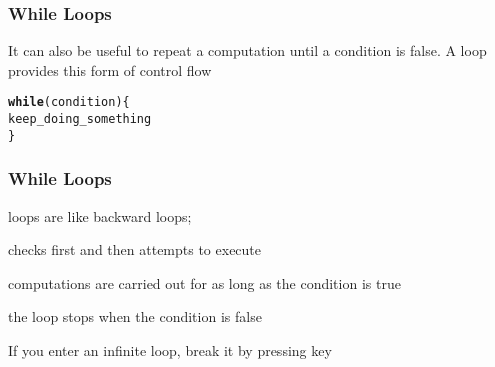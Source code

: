 \documentclass[12pt]{beamer}\usepackage[]{graphicx}\usepackage[]{color}
\makeatletter
\newcommand{\hlstd}[1]{\textcolor[rgb]{0.345,0.345,0.345}{#1}}%
\newcommand{\hlkwa}[1]{\textcolor[rgb]{0.161,0.373,0.58}{\textbf{#1}}}%
\newenvironment{kframe}{%
 \def\at@end@of@kframe{}%
 \ifinner\ifhmode%
  \def\at@end@of@kframe{\end{minipage}}%
  \begin{minipage}{\columnwidth}%
 \fi\fi%
 \def\FrameCommand##1{\hskip\@totalleftmargin \hskip-\fboxsep
 \colorbox{shadecolor}{##1}\hskip-\fboxsep
     \hskip-\linewidth \hskip-\@totalleftmargin \hskip\columnwidth}%
 \MakeFramed {\advance\hsize-\width
   \@totalleftmargin\z@ \linewidth\hsize
   \@setminipage}}%
 {\par\unskip\endMakeFramed%
 \at@end@of@kframe}
\newenvironment{knitrout}{}{} %
\makeatother
\begin{document}

\begin{frame}
\begin{center}
\Huge{}
\end{center}
\end{frame}


\begin{frame}[fragile]
\frametitle{While Loops}

It can also be useful to repeat a computation until a condition is false. A  loop provides this form of control flow
\begin{knitrout}\footnotesize
{}\color{fgcolor}\begin{kframe}
\begin{alltt}
\hlkwa{while} \hlstd{(condition) \{}
  \hlstd{keep_doing_something}
\hlstd{\}}
\end{alltt}
\end{kframe}
\end{knitrout}
\end{frame}


\begin{frame}[fragile]
\frametitle{While Loops}

\bi
  \item {} loops are like backward  loops; 
  \item {} checks first and then attempts to execute
  \item computations are carried out for as long as the condition is true
  \item the loop stops when the condition is false
  \item If you enter an infinite loop, break it by pressing  key
\ei

\end{frame}

\end{document}

